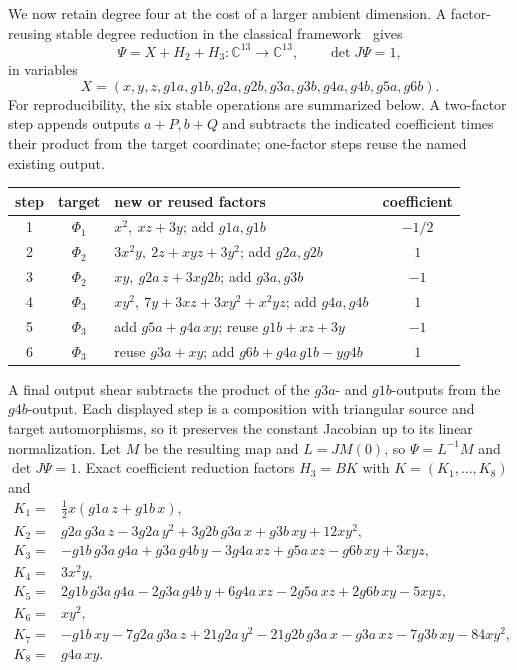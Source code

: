 \documentclass[11pt]{article}
\newcommand{\C}{\mathbb C}
\begin{document}
We now retain degree four at the cost of a larger ambient dimension.  A
factor-reusing stable degree reduction in the classical
framework~\cite{bcw} gives
\begin{equation}
 \Psi=X+H_2+H_3:\C^{13}\to\C^{13},\qquad \det J\Psi=1,
 \label{eq:Psi13}
\end{equation}
in variables
\[
X=(x,y,z,g1a,g1b,g2a,g2b,g3a,g3b,g4a,g4b,g5a,g6b).
\]
For reproducibility, the six stable operations are summarized below.  A
two-factor step appends outputs $a+P,b+Q$ and subtracts the indicated
coefficient times their product from the target coordinate; one-factor steps
reuse the named existing output.
\begin{center}\small
\begin{tabular}{c|c|p{}|c}
\toprule
step&target&new or reused factors&coefficient\\
\midrule
1&$\Phi_1$&$x^2,\ xz+3y$; add $g1a,g1b$&$-1/2$\\
2&$\Phi_2$&$3x^2y,\ 2z+xyz+3y^2$; add $g2a,g2b$&$1$\\
3&$\Phi_2$&$xy,\ g2a\,z+3xg2b$; add $g3a,g3b$&$-1$\\
4&$\Phi_3$&$xy^2,\ 7y+3xz+3xy^2+x^2yz$; add $g4a,g4b$&$1$\\
5&$\Phi_3$&add $g5a+g4a\,xy$; reuse $g1b+xz+3y$&$-1$\\
6&$\Phi_3$&reuse $g3a+xy$; add $g6b+g4a\,g1b-yg4b$&$1$\\
\bottomrule
\end{tabular}
\end{center}
A final output shear subtracts the product of the $g3a$- and $g1b$-outputs
from the $g4b$-output.  Each displayed step is a composition with triangular
source and target automorphisms, so it preserves the constant Jacobian up to
its linear normalization.  Let $M$ be the resulting map and $L=JM(0)$, so
$\Psi=L^{-1}M$ and $\det J\Psi=1$.  Exact coefficient reduction factors
$H_3=BK$ with
$K=(K_1,\ldots,K_8)$ and
\begin{align}
K_1={}&\tfrac12x(g1a\,z+g1b\,x),\nonumber\\
K_2={}&g2a\,g3a\,z-3g2a\,y^2+3g2b\,g3a\,x+g3b\,xy+12xy^2,\nonumber\\
K_3={}&-g1b\,g3a\,g4a+g3a\,g4b\,y-3g4a\,xz+g5a\,xz-g6b\,xy+3xyz,\nonumber\\
K_4={}&3x^2y,\nonumber\\
K_5={}&2g1b\,g3a\,g4a-2g3a\,g4b\,y+6g4a\,xz-2g5a\,xz+2g6b\,xy-5xyz,
\label{eq:K}\\
K_6={}&xy^2,\nonumber\\
K_7={}&-g1b\,xy-7g2a\,g3a\,z+21g2a\,y^2-21g2b\,g3a\,x-g3a\,xz
-7g3b\,xy-84xy^2,\nonumber\\
K_8={}&g4a\,xy.\nonumber
\end{align}
\end{document}
